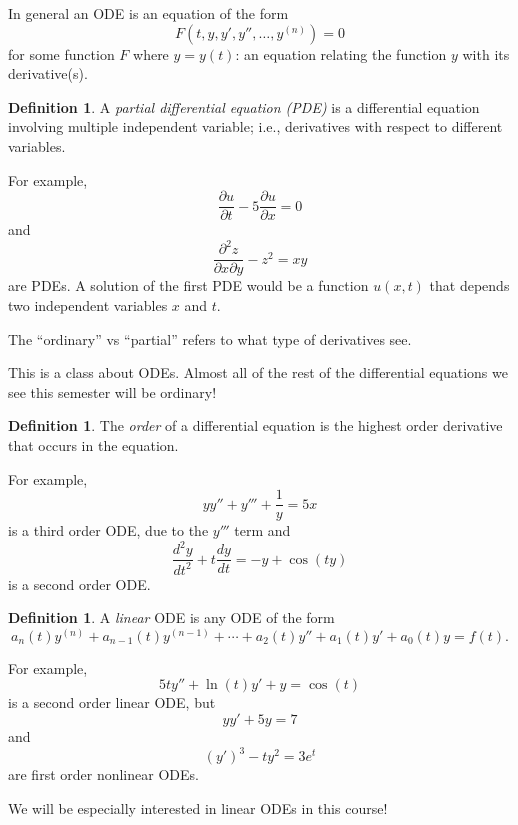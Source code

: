 \documentclass[12pt]{amsart}
\numberwithin{equation}{section}
\theoremstyle{plain} %
\theoremstyle{definition}
\newtheorem{defn}[equation]{Definition}
\theoremstyle{remark}
\begin{document}
In general an ODE is an equation of the form \[F(t,y,y',y'',\dots,y^{(n)})=0\] for some function $F$ where $y=y(t)$: an equation relating the function $y$ with its derivative(s).

\begin{defn} A \emph{partial differential equation (PDE)} is a differential equation involving multiple independent variable; i.e., derivatives with respect to different variables.
\end{defn}
For example, 
\[ \frac{\partial u}{\partial t} - 5 \frac{\partial u}{\partial x} = 0\]
and 
\[ \frac{\partial^2 z}{\partial x \partial y} -z^2 = xy\]
are PDEs. A solution of the first PDE would be a function $u(x,t)$ that depends two independent variables $x$ and $t$.
 
The ``ordinary'' vs ``partial'' refers to what type of derivatives see. 

This is a class about ODEs. Almost all of the rest of the differential equations we see this semester will be ordinary!


\begin{defn} The \emph{order} of a differential equation is the highest order derivative that occurs in the equation.
\end{defn}

For example,
\[ y y'' +  y''' + \frac{1}{y} = 5x\]
is a third order ODE, due to the $y'''$ term and
 \[ \frac{d^2 y}{dt^2} + t \frac{dy}{dt} = -y + \cos(ty)\]
 is a second order ODE.
 
 \begin{defn} A \emph{linear} ODE is any ODE of the form
 \[ a_n(t) y^{(n)} + a_{n-1}(t) y^{(n-1)} + \cdots + a_2(t) y'' + a_1(t) y' + a_0(t) y = f(t).\]
 \end{defn}
 For example,
 \[ 5t y'' + \ln(t) y' + y = \cos(t)\]
 is a second order linear ODE, but 
 \[ y y' + 5y = 7\]
 and 
 \[ (y')^3 - t y^2 = 3 e^t\]
are first order nonlinear ODEs.

We will be especially interested in linear ODEs in this course!

 
\end{document}
